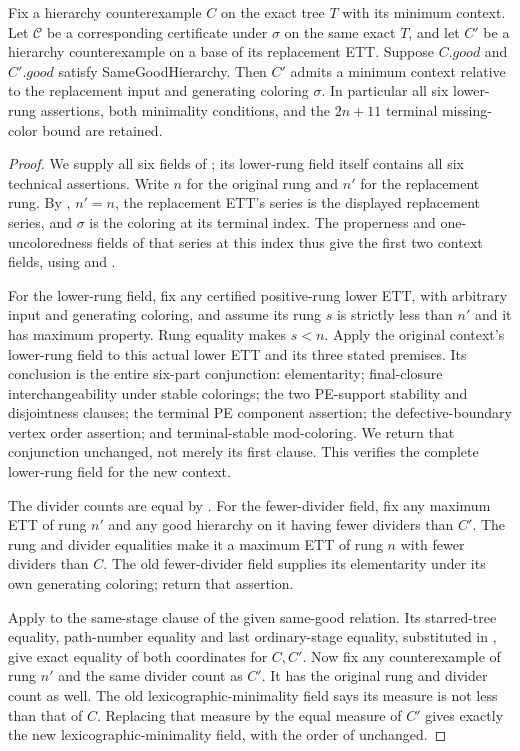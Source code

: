 \begin{lemma}
Fix a hierarchy counterexample $C$ on the exact tree $T$ with its minimum
context. Let $\mathcal C$ be a corresponding certificate under $\sigma$
on the same exact $T$, and let $C'$ be a hierarchy counterexample on a
base of its replacement ETT. Suppose $C.\mathit{good}$ and
$C'.\mathit{good}$ satisfy SameGoodHierarchy. Then $C'$ admits a minimum
context relative to the replacement input and generating coloring
$\sigma$. In particular all six lower-rung assertions, both minimality
conditions, and the $2n+11$ terminal missing-color bound are retained.
\end{lemma}
\begin{proof}
We supply all six fields of
; its lower-rung field
itself contains all six technical assertions. Write $n$ for the original
rung and $n'$ for the replacement rung.
By , $n'=n$, the replacement
ETT's series is the displayed replacement series, and $\sigma$ is the
coloring at its terminal index. The properness and one-uncoloredness
fields of that series at this index thus give the first two context
fields, using  and
.

For the lower-rung field, fix any certified positive-rung lower ETT, with
arbitrary input and generating coloring, and assume its rung $s$ is
strictly less than $n'$ and it has maximum property. Rung equality makes
$s<n$. Apply the original context's lower-rung field to this actual lower
ETT and its three stated premises. Its conclusion is the entire six-part
conjunction: elementarity; final-closure interchangeability under stable
colorings; the two PE-support stability and disjointness clauses; the
terminal PE component assertion; the defective-boundary vertex order
assertion; and terminal-stable mod-coloring. We return that conjunction
unchanged, not merely its first clause. This verifies the complete
lower-rung field for the new context.

The divider counts are equal by . For the
fewer-divider field, fix any maximum ETT of rung $n'$ and any good hierarchy
on it having fewer dividers than $C'$. The rung and divider equalities make
it a maximum ETT of rung $n$ with fewer dividers than $C$. The old
fewer-divider field supplies its elementarity under its own generating
coloring; return that assertion.

Apply  to the same-stage clause of
the given same-good relation. Its starred-tree equality, path-number
equality and last ordinary-stage equality, substituted in
, give exact equality of both
coordinates for $C,C'$. Now fix any counterexample of rung $n'$ and
the same divider count as $C'$. It has the original rung and divider count
as well. The old lexicographic-minimality field says its measure is not
less than that of $C$. Replacing that measure by the equal measure of
$C'$ gives exactly the new lexicographic-minimality field, with the order
of  unchanged.


\end{proof}
